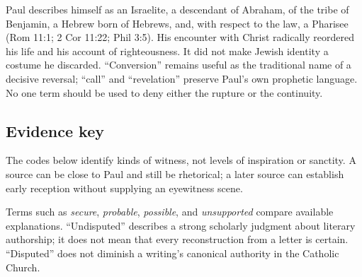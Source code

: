 Paul describes himself as an Israelite, a descendant of Abraham, of the tribe
of Benjamin, a Hebrew born of Hebrews, and, with respect to the law, a
Pharisee (Rom 11:1; 2 Cor 11:22; Phil 3:5). His encounter with Christ radically
reordered his life and his account of righteousness. It did not make Jewish
identity a costume he discarded. ``Conversion'' remains useful as the
traditional name of a decisive reversal; ``call'' and ``revelation'' preserve
Paul's own prophetic language. No one term should be used to deny either the
rupture or the continuity.

\subsection{Evidence key}

The codes below identify kinds of witness, not levels of inspiration or
sanctity. A source can be close to Paul and still be rhetorical; a later source
can establish early reception without supplying an eyewitness scene.

\begin{evidencelegend}
\end{evidencelegend}

Terms such as \emph{secure}, \emph{probable}, \emph{possible}, and
\emph{unsupported} compare available explanations. ``Undisputed'' describes a
strong scholarly judgment about literary authorship; it does not mean that
every reconstruction from a letter is certain. ``Disputed'' does not diminish
a writing's canonical authority in the Catholic Church.

